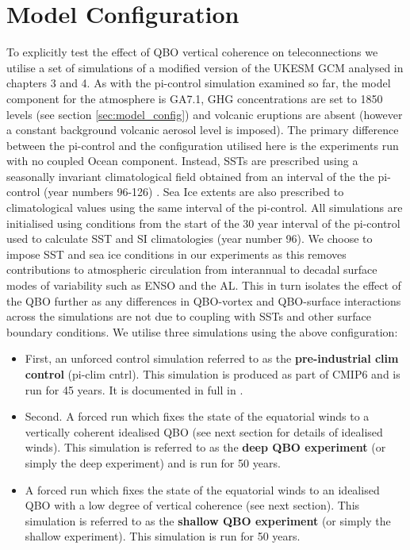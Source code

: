 \section{Model Configuration}

To explicitly test the effect of QBO vertical coherence on teleconnections we utilise a set of simulations of a modified version of the UKESM GCM analysed in chapters 3 and 4. As with the pi-control simulation examined so far, the model component for the atmosphere is GA7.1, GHG concentrations are set to 1850 levels (see section \ref{sec:model_config}) and volcanic eruptions are absent (however a constant background volcanic aerosol level is imposed). The primary difference between the pi-control and the configuration utilised here is the experiments run with no coupled Ocean component. Instead, SSTs are prescribed using a seasonally invariant climatological field obtained from an interval of the the pi-control (year numbers 96-126) \cite{oconnorAssessment2021}. Sea Ice extents are also prescribed to climatological values using the same interval of the pi-control. All simulations are initialised using conditions from the start of the 30 year interval of the pi-control used to calculate SST and SI climatologies (year number 96). We choose to impose SST and sea ice conditions in our experiments as this removes contributions to atmospheric circulation from interannual to decadal surface modes of variability such as ENSO and the AL. This in turn isolates the effect of the QBO further as any differences in QBO-vortex and QBO-surface interactions across the simulations are not due to coupling with SSTs and other surface boundary conditions. We utilise three simulations using the above configuration:

\begin{itemize}
    \item First, an unforced control simulation referred to as the \textbf{pre-industrial clim control} (pi-clim cntrl). This simulation is produced as part of CMIP6 and is run for 45 years. It is documented in full in \cite{oconnorAssessment2021}. 
    
    \item Second. A forced run which fixes the state of the equatorial winds to a vertically coherent idealised QBO (see next section for details of idealised winds). This simulation is referred to as the \textbf{deep QBO experiment} (or simply the deep experiment) and is run for 50 years.
    
    \item A forced run which fixes the state of the equatorial winds to an idealised QBO with a low degree of vertical coherence (see next section). This simulation is referred to as the \textbf{shallow QBO experiment} (or simply the shallow experiment). This simulation is run for 50 years.
    
\end{itemize}

